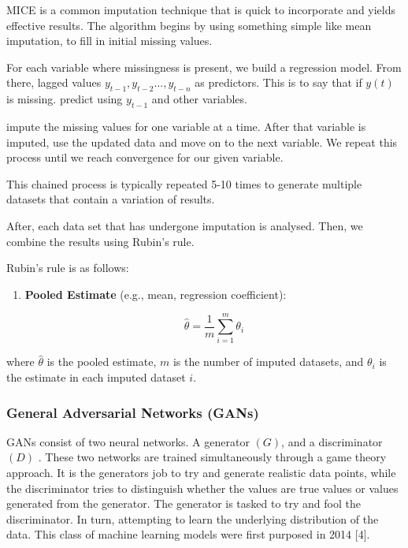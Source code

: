 \documentclass[
]{report}
\begin{document}
MICE is a common imputation technique that is quick to incorporate and
yields effective results. The algorithm begins by using something simple
like mean imputation, to fill in initial missing values.

For each variable where missingness is present, we build a regression
model. From there, lagged values \({y_{t-1}, y_{t-2}...,y_{t-n}}\) as
predictors. This is to say that if \({y(t)}\) is missing. predict using
\(y_{t-1}\) and other variables.

impute the missing values for one variable at a time. After that
variable is imputed, use the updated data and move on to the next
variable. We repeat this process until we reach convergence for our
given variable.

This chained process is typically repeated 5-10 times to generate
multiple datasets that contain a variation of results.

After, each data set that has undergone imputation is analysed. Then, we
combine the results using Rubin's rule.

Rubin's rule is as follows:

\begin{enumerate}
\def\labelenumi{\arabic{enumi}.}
\item
  \textbf{Pooled Estimate} (e.g., mean, regression coefficient):

  \[\hat{\theta} = \frac{1}{m}\sum_{i=1}^{m}\theta_{i}\]
\end{enumerate}

where \(\hat{\theta}\) is the pooled estimate, \(m\) is the number of
imputed datasets, and \(\theta_i\) is the estimate in each imputed
dataset \(i\).

\subsubsection{General Adversarial Networks
(GANs)}\label{general-adversarial-networks-gans}

GANs consist of two neural networks. A generator \((G)\), and a
discriminator \((D)\) . These two networks are trained simultaneously
through a game theory approach. It is the generators job to try and
generate realistic data points, while the discriminator tries to
distinguish whether the values are true values or values generated from
the generator. The generator is tasked to try and fool the
discriminator. In turn, attempting to learn the underlying distribution
of the data. This class of machine learning models were first purposed
in 2014 {[}4{]}.
\end{document}
